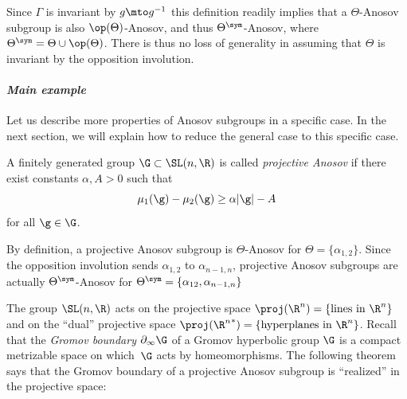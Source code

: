 \begin{rmk}
Since $\Gamma$ is invariant by $g\mto g^{-1}$ this definition readily implies that a $\Theta$-Anosov subgroup is also $\op(\Theta)$-Anosov, and thus $\Theta^{\sym}$-Anosov, where $\Theta^{\sym} = \Theta \cup \op(\Theta)$. There is thus no loss of generality in assuming that $\Theta$ is invariant by the opposition involution.
\end{rmk}

\paragraph{{\it Main example}}

Let us describe more properties of Anosov subgroups in a specific case. In the next section, we will explain how to reduce the general case to this specific case.
\begin{defi}
A finitely generated group $\G \subset \SL(n,\R)$ is called \emph{projective Anosov} if there exist constants $\alpha, A>0$ such that\vspace*{-3pt}
\[\mu_1(\g) - \mu_2(\g) \geq \alpha \vert \g \vert - A\]
for all $\g\in \G$.
\end{defi}

\begin{rmk}
By definition, a projective Anosov subgroup is $\Theta$-Anosov for $\Theta =\{\alpha_{1,2}\}$. Since the opposition involution sends $\alpha_{1,2}$ to $\alpha_{n-1, n}$, projective Anosov subgroups are actually $\Theta^{\sym}$-Anosov for $\Theta^{\sym} =\{\alpha_{12}, \alpha_{n-1,n}\}$
\end{rmk}

The group $\SL(n,\R)$ acts on the projective space $\proj(\R^n) = \{\textrm{lines in }\R^n\}$ and on the ``dual'' projective space $\proj({\R^n}^*)= \{\textrm{hyperplanes in }\R^n\}$. Recall that the \emph{Gromov boundary} $\partial_\infty \G$ of a Gromov hyperbolic group $\G$ is a compact metrizable space on which~$\G$ acts by homeomorphisms. The following theorem says that the Gromov boundary of a projective Anosov subgroup is ``realized'' in the projective space:

